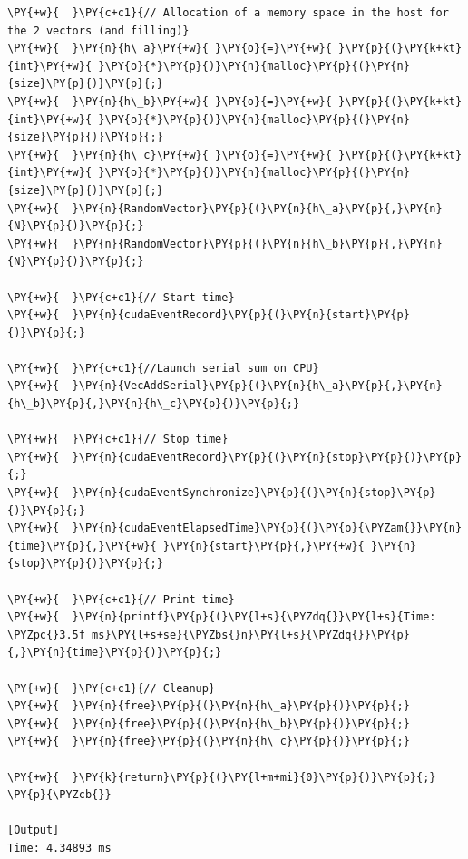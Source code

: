 \begin{Verbatim}[label=\makebox{\url{https://github.com/lucabaldini/cmepda/tree/master/slides/latex/snippets/cuda_vec_add_serial.cu}},commandchars=\\\{\}]
\PY{+w}{  }\PY{c+c1}{// Allocation of a memory space in the host for the 2 vectors (and filling)}
\PY{+w}{  }\PY{n}{h\_a}\PY{+w}{ }\PY{o}{=}\PY{+w}{ }\PY{p}{(}\PY{k+kt}{int}\PY{+w}{ }\PY{o}{*}\PY{p}{)}\PY{n}{malloc}\PY{p}{(}\PY{n}{size}\PY{p}{)}\PY{p}{;}
\PY{+w}{  }\PY{n}{h\_b}\PY{+w}{ }\PY{o}{=}\PY{+w}{ }\PY{p}{(}\PY{k+kt}{int}\PY{+w}{ }\PY{o}{*}\PY{p}{)}\PY{n}{malloc}\PY{p}{(}\PY{n}{size}\PY{p}{)}\PY{p}{;}
\PY{+w}{  }\PY{n}{h\_c}\PY{+w}{ }\PY{o}{=}\PY{+w}{ }\PY{p}{(}\PY{k+kt}{int}\PY{+w}{ }\PY{o}{*}\PY{p}{)}\PY{n}{malloc}\PY{p}{(}\PY{n}{size}\PY{p}{)}\PY{p}{;}
\PY{+w}{  }\PY{n}{RandomVector}\PY{p}{(}\PY{n}{h\_a}\PY{p}{,}\PY{n}{N}\PY{p}{)}\PY{p}{;}
\PY{+w}{  }\PY{n}{RandomVector}\PY{p}{(}\PY{n}{h\_b}\PY{p}{,}\PY{n}{N}\PY{p}{)}\PY{p}{;}

\PY{+w}{  }\PY{c+c1}{// Start time}
\PY{+w}{  }\PY{n}{cudaEventRecord}\PY{p}{(}\PY{n}{start}\PY{p}{)}\PY{p}{;}

\PY{+w}{  }\PY{c+c1}{//Launch serial sum on CPU}
\PY{+w}{  }\PY{n}{VecAddSerial}\PY{p}{(}\PY{n}{h\_a}\PY{p}{,}\PY{n}{h\_b}\PY{p}{,}\PY{n}{h\_c}\PY{p}{)}\PY{p}{;}

\PY{+w}{  }\PY{c+c1}{// Stop time}
\PY{+w}{  }\PY{n}{cudaEventRecord}\PY{p}{(}\PY{n}{stop}\PY{p}{)}\PY{p}{;}
\PY{+w}{  }\PY{n}{cudaEventSynchronize}\PY{p}{(}\PY{n}{stop}\PY{p}{)}\PY{p}{;}
\PY{+w}{  }\PY{n}{cudaEventElapsedTime}\PY{p}{(}\PY{o}{\PYZam{}}\PY{n}{time}\PY{p}{,}\PY{+w}{ }\PY{n}{start}\PY{p}{,}\PY{+w}{ }\PY{n}{stop}\PY{p}{)}\PY{p}{;}

\PY{+w}{  }\PY{c+c1}{// Print time}
\PY{+w}{  }\PY{n}{printf}\PY{p}{(}\PY{l+s}{\PYZdq{}}\PY{l+s}{Time: \PYZpc{}3.5f ms}\PY{l+s+se}{\PYZbs{}n}\PY{l+s}{\PYZdq{}}\PY{p}{,}\PY{n}{time}\PY{p}{)}\PY{p}{;}

\PY{+w}{  }\PY{c+c1}{// Cleanup}
\PY{+w}{  }\PY{n}{free}\PY{p}{(}\PY{n}{h\_a}\PY{p}{)}\PY{p}{;}
\PY{+w}{  }\PY{n}{free}\PY{p}{(}\PY{n}{h\_b}\PY{p}{)}\PY{p}{;}
\PY{+w}{  }\PY{n}{free}\PY{p}{(}\PY{n}{h\_c}\PY{p}{)}\PY{p}{;}

\PY{+w}{  }\PY{k}{return}\PY{p}{(}\PY{l+m+mi}{0}\PY{p}{)}\PY{p}{;}
\PY{p}{\PYZcb{}}

[Output]
Time: 4.34893 ms
\end{Verbatim}